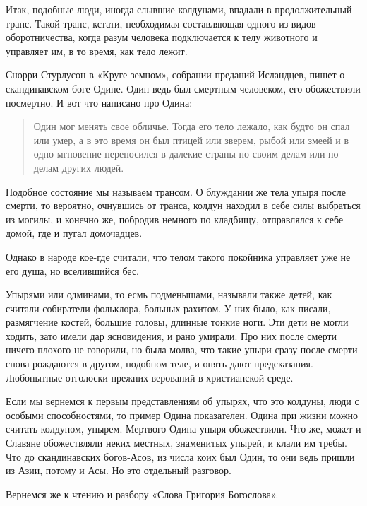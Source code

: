 \documentclass[a5paper,11pt,openany]{article}
\begin{document}
   Итак, подобные люди, иногда слывшие колдунами, впадали в продолжительный транс. Такой транс, кстати, необходимая составляющая одного из видов оборотничества, когда разум человека подключается к телу животного и управляет им, в то время, как тело лежит. 

   Снорри Стурлусон в «Круге земном», собрании преданий Исландцев, пишет о скандинавском боге Одине. Один ведь был смертным человеком, его обожествили посмертно. И вот что написано про Одина:

\begin{quotation}
\noindent Один мог менять свое обличье. Тогда его тело лежало, как будто он спал или умер, а в
это время он был птицей или зверем, рыбой
или змеей и в одно мгновение переносился в
далекие страны по своим делам или по делам
других людей.
\end{quotation}

   Подобное состояние мы называем трансом. %
   О блуждании же тела упыря после смерти, то вероятно, очнувшись от транса, колдун находил в себе силы выбраться из могилы, и конечно же, побродив немного по кладбищу, отправлялся к себе домой, где и пугал домочадцев.

   Однако в народе кое-где считали, что телом такого покойника управляет уже не его душа, но вселившийся бес.

   Упырями или одминами, то есмь подменышами, называли также детей, как считали собиратели фольклора, больных рахитом. У них было, как писали, размягчение костей, большие головы, длинные тонкие ноги. Эти дети не могли ходить, зато имели дар ясновидения, и рано умирали. Про них после смерти ничего плохого не говорили, но была молва, что такие упыри сразу после смерти снова рождаются в другом, подобном теле, и опять дают предсказания. Любопытные отголоски прежних верований в христианской среде.

   Если мы вернемся к первым представлениям об упырях, что это колдуны, люди с особыми способностями, то пример Одина показателен. Одина при жизни можно считать колдуном, упырем. Мертвого Одина-упыря обожествили. Что же, может и Славяне обожествляли неких местных, знаменитых упырей, и клали им требы. Что до скандинавских богов-Асов, из числа коих был Один, то они ведь пришли из Азии, потому и Асы. Но это отдельный разговор.

   Вернемся же к чтению и разбору «Слова Григория Богослова».
\end{document}
